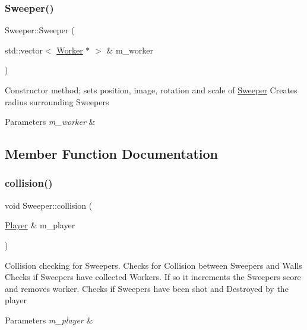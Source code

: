 \subsubsection{\texorpdfstring{Sweeper()}{Sweeper()}}
{\footnotesize\ttfamily Sweeper\+::\+Sweeper (\begin{DoxyParamCaption}\item[{std\+::vector$<$ \mbox{\hyperlink{class_worker}{Worker}} $\ast$ $>$ \&}]{m\+\_\+worker }\end{DoxyParamCaption})}



Constructor method; sets position, image, rotation and scale of \mbox{\hyperlink{class_sweeper}{Sweeper}} Creates radius surrounding Sweepers 


\begin{DoxyParams}{Parameters}
{\em m\+\_\+worker} & \\
\hline
\end{DoxyParams}


\subsection{Member Function Documentation}
\mbox{\label{class_sweeper_a798701d04c6defb37e778da27a32054d}} 
\subsubsection{\texorpdfstring{collision()}{collision()}}
{\footnotesize\ttfamily void Sweeper\+::collision (\begin{DoxyParamCaption}\item[{\mbox{\hyperlink{class_player}{Player}} \&}]{m\+\_\+player }\end{DoxyParamCaption})}



Collision checking for Sweepers. Checks for Collision between Sweepers and Walls Checks if Sweepers have collected Workers. If so it increments the Sweepers\textquotesingle{} score and removes worker. Checks if Sweepers have been shot and Destroyed by the player 


\begin{DoxyParams}{Parameters}
{\em m\+\_\+player} & \\
\hline
\end{DoxyParams}
\mbox{\label{class_sweeper_a97c66e303a24b8c864ef74a39337f853}} 
